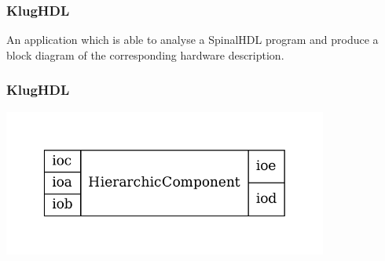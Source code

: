 \documentclass[11pt, handout]{beamer}
\begin{document}
\begin{frame}
  \frametitle{KlugHDL}
  \begin{tcolorbox}
  An application which is able to analyse a SpinalHDL program and produce a
  block diagram of the corresponding hardware description.
  \end{tcolorbox}
\end{frame}

\begin{frame}
  \frametitle{KlugHDL}
  \begin{center}
  \includegraphics[width=0.8\textwidth]{hierarchic_component}
  \end{center}
\end{frame}
\end{document}
